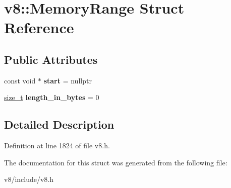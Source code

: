 \hypertarget{structv8_1_1MemoryRange}{}\section{v8\+:\+:Memory\+Range Struct Reference}
\label{structv8_1_1MemoryRange}
\subsection*{Public Attributes}
\begin{DoxyCompactItemize}
\item 
\mbox{\label{structv8_1_1MemoryRange_a3dea80a77e98bb0b9ff20fa27cb13280}} 
const void $\ast$ {\bfseries start} = nullptr
\item 
\mbox{\label{structv8_1_1MemoryRange_a03b4862f20703ce8b94c30850451b870}} 
\mbox{\hyperlink{classsize__t}{size\+\_\+t}} {\bfseries length\+\_\+in\+\_\+bytes} = 0
\end{DoxyCompactItemize}


\subsection{Detailed Description}


Definition at line 1824 of file v8.\+h.



The documentation for this struct was generated from the following file\+:\begin{DoxyCompactItemize}
\item 
v8/include/v8.\+h\end{DoxyCompactItemize}
